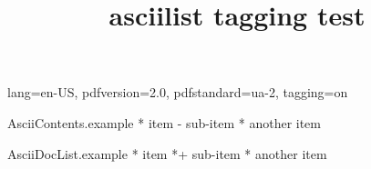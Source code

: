 \DocumentMetadata
  {
    lang=en-US,
    pdfversion=2.0,
    pdfstandard=ua-2,
    tagging=on
  }
\begin{filecontents*}[overwrite]{AsciiContents.example}
 * item
   - sub-item
 * another item
\end{filecontents*}
\begin{filecontents*}[overwrite]{AsciiDocList.example}
* item
*+ sub-item
* another item
\end{filecontents*}

\documentclass{article}
\usepackage{asciilist}

\title{asciilist tagging test}



\begin{enumerate}
\item bla
\item blub
\end{enumerate}



